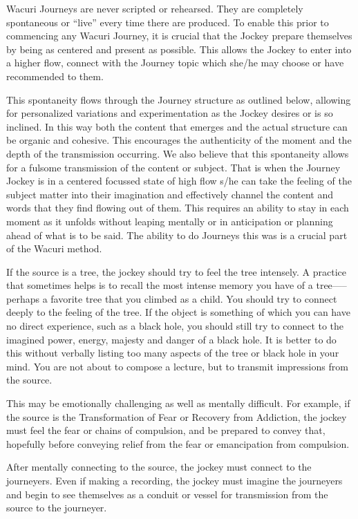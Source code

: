 \documentclass[12pt]{book}
\begin{document}
Wacuri Journeys are never scripted or rehearsed. They are
completely spontaneous or “live” every time there are produced. To
enable this prior to commencing any Wacuri Journey, it is crucial that
the Jockey prepare themselves by being as centered and present as
possible. This allows the Jockey to enter into a higher flow, connect
with the Journey topic which she/he may choose or have recommended to
them.

This spontaneity flows through the Journey structure as outlined
below, allowing for personalized variations and experimentation as the
Jockey desires or is so inclined. In this way both the content that
emerges and the actual structure can be organic and cohesive. This
encourages the authenticity of the moment and the depth of the
transmission occurring.  We also believe that this spontaneity allows
for a fulsome transmission of the content or subject. That is when the
Journey Jockey is in a centered focussed state of high flow s/he can
take the feeling of the subject matter into their imagination and
effectively channel the content and words that they find flowing out
of them. This requires an ability to stay in each moment as it
unfolds without leaping mentally or in anticipation or planning ahead
of what is to be said.  The ability to do Journeys this was is a
crucial part of the Wacuri method.
					
If the source is a tree, the jockey should try to feel the tree intensely. A practice that sometimes helps is to recall the most intense memory you have of a tree—--perhaps a favorite tree that you climbed as a child. You should try to connect deeply  to the feeling of the tree. If the object is something of which you can have no direct experience, such as a black hole, you should still try to connect to the imagined power, energy, majesty and danger of a black hole. It is better to do this without verbally listing too many aspects of the tree or black hole in your mind. You are not about to compose a lecture, but to transmit impressions from the source.
					
This may be emotionally challenging as well as mentally difficult. For example, if the source is the Transformation of Fear or Recovery from Addiction, the jockey must feel the fear or chains of compulsion, and be prepared to convey that, hopefully before conveying relief from the fear or emancipation from compulsion.
					
After mentally connecting to the source, the jockey must connect to the journeyers. Even if making a recording, the jockey must imagine the journeyers and begin to see themselves as a conduit or vessel for transmission from the source to the journeyer.
					
\end{document}
